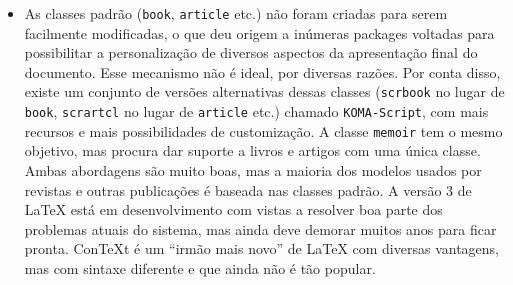 \begin{itemize}
    \item As classes padrão (\texttt{book}, \texttt{article} etc.) não foram criadas
    para serem facilmente modificadas, o que deu origem a inúmeras packages
    voltadas para possibilitar a personalização de diversos aspectos da
    apresentação final do documento. Esse mecanismo não é ideal, por diversas
    razões. Por conta disso, existe um conjunto de versões alternativas dessas
    classes (\texttt{scrbook} no lugar de \texttt{book}, \texttt{scrartcl} no lugar de
    \texttt{article} etc.) chamado \texttt{KOMA-Script}, com mais recursos e mais
    possibilidades de customização. A classe \texttt{memoir} tem o mesmo objetivo,
    mas procura dar suporte a livros e artigos com uma única classe. Ambas
    abordagens são muito boas, mas a maioria dos modelos usados por revistas e
    outras publicações é baseada nas classes padrão. A versão 3 de \LaTeX{}
    está em desenvolvimento com vistas a resolver boa parte dos problemas
    atuais do sistema, mas ainda deve demorar muitos anos para ficar pronta.
    Con\TeX{}t é um ``irmão mais novo'' de \LaTeX{} com diversas
    vantagens, mas com sintaxe diferente e que ainda não é tão popular.
\end{itemize}

